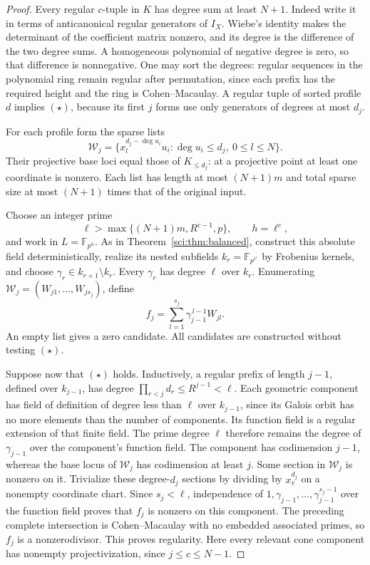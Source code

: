 \begin{proof}
Every regular \(c\)-tuple in \(K\) has degree sum at least \(N+1\).
Indeed write it in terms of anticanonical regular generators of \(I_X\).
Wiebe's identity makes the determinant of the coefficient matrix nonzero,
and its degree is the difference of the two degree sums. A homogeneous
polynomial of negative degree is zero, so that difference is nonnegative.
One may sort the degrees: regular sequences in the polynomial ring
remain regular after permutation, since each prefix has the required
height and the ring is Cohen--Macaulay. A regular tuple of sorted
profile \(d\) implies \((\star)\), because its first \(j\) forms
use only generators of degrees at most \(d_j\).

For each profile form the sparse lists
\[
 \mathcal W_j=
 \{x_l^{d_j-\deg u_i}u_i:
       \deg u_i\leq d_j,\ 0\leq l\leq N\}.
\]
Their projective base loci equal those of \(K_{\leq d_j}\): at a
projective point at least one coordinate is nonzero. Each list has
length at most \((N+1)m\) and total sparse size at most \((N+1)\)
times that of the original input.

Choose an integer prime
\[
 \ell>\max\{(N+1)m,R^{c-1},p\},\qquad h=\ell^c,
\]
and work in \(L=\mathbb F_{p^h}\). As in
Theorem~\ref{sci:thm:balanced}, construct this absolute field
deterministically, realize its nested subfields
\(k_r=\mathbb F_{p^{\ell^r}}\) by Frobenius kernels, and choose
\(\gamma_r\in k_{r+1}\setminus k_r\). Every \(\gamma_r\) has
degree \(\ell\) over \(k_r\). Enumerating
\(\mathcal W_j=(W_{j1},\ldots,W_{js_j})\), define
\[
 f_j=\sum_{l=1}^{s_j}\gamma_{j-1}^{\,l-1}W_{jl}.
\]
An empty list gives a zero candidate. All candidates are constructed
without testing \((\star)\).

Suppose now that \((\star)\) holds. Inductively, a regular prefix
of length \(j-1\), defined over \(k_{j-1}\), has degree
\(\prod_{r<j}d_r\leq R^{j-1}<\ell\). Each geometric component
has field of definition of degree less than \(\ell\) over
\(k_{j-1}\), since its Galois orbit has no more elements than the
number of components. Its function field is a regular extension of
that finite field. The prime degree \(\ell\) therefore remains
the degree of \(\gamma_{j-1}\) over the component's function field.
The component has codimension \(j-1\), whereas the base locus of
\(\mathcal W_j\) has codimension at least \(j\). Some section
in \(\mathcal W_j\) is nonzero on it. Trivialize these degree-\(d_j\)
sections by dividing by \(x_v^{d_j}\) on a nonempty coordinate chart.
Since \(s_j<\ell\), independence of
\(1,\gamma_{j-1},\ldots,\gamma_{j-1}^{s_j-1}\) over the function
field proves that \(f_j\) is nonzero on this component. The preceding
complete intersection is Cohen--Macaulay with no embedded associated
primes, so \(f_j\) is a nonzerodivisor. This proves regularity.
Here every relevant cone component has nonempty projectivization,
since \(j\leq c\leq N-1\).


\end{proof}
